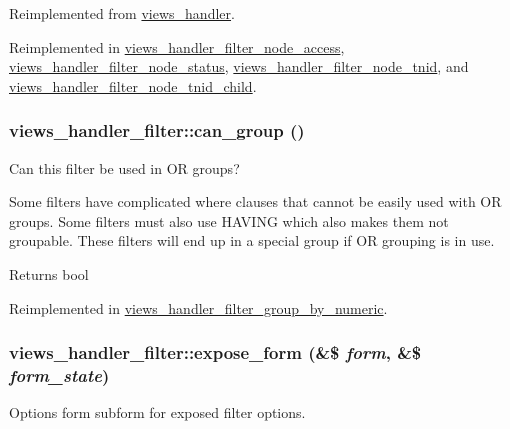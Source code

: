 Reimplemented from \hyperlink{classviews__handler_a92517d122d69dc6f64a9edb80d55057d}{views\_\-handler}.

Reimplemented in \hyperlink{classviews__handler__filter__node__access_a20eacba1b9be3c0e6b8245191b60a9ff}{views\_\-handler\_\-filter\_\-node\_\-access}, \hyperlink{classviews__handler__filter__node__status_adaece4fdfbc098bb12b83a7cae193cc3}{views\_\-handler\_\-filter\_\-node\_\-status}, \hyperlink{classviews__handler__filter__node__tnid_a9e6111d77af1aefee0b78d7b3b2c25cc}{views\_\-handler\_\-filter\_\-node\_\-tnid}, and \hyperlink{classviews__handler__filter__node__tnid__child_a2c6527f01666eaf0ba38eff4798ec732}{views\_\-handler\_\-filter\_\-node\_\-tnid\_\-child}.\hypertarget{classviews__handler__filter_a34aea08dca7f859afaff0f66610724bd}{
\subsubsection[{can\_\-group}]{\setlength{\rightskip}{0pt plus 5cm}views\_\-handler\_\-filter::can\_\-group ()}}
\label{classviews__handler__filter_a34aea08dca7f859afaff0f66610724bd}
Can this filter be used in OR groups?

Some filters have complicated where clauses that cannot be easily used with OR groups. Some filters must also use HAVING which also makes them not groupable. These filters will end up in a special group if OR grouping is in use.

\begin{DoxyReturn}{Returns}
bool 
\end{DoxyReturn}


Reimplemented in \hyperlink{classviews__handler__filter__group__by__numeric_a9c16e172f827009497a1a6bac7782b3b}{views\_\-handler\_\-filter\_\-group\_\-by\_\-numeric}.\hypertarget{classviews__handler__filter_a9537c9a30fb9008361efdfdde46633cd}{
\subsubsection[{expose\_\-form}]{\setlength{\rightskip}{0pt plus 5cm}views\_\-handler\_\-filter::expose\_\-form (\&\$ {\em form}, \/  \&\$ {\em form\_\-state})}}
\label{classviews__handler__filter_a9537c9a30fb9008361efdfdde46633cd}
Options form subform for exposed filter options.

